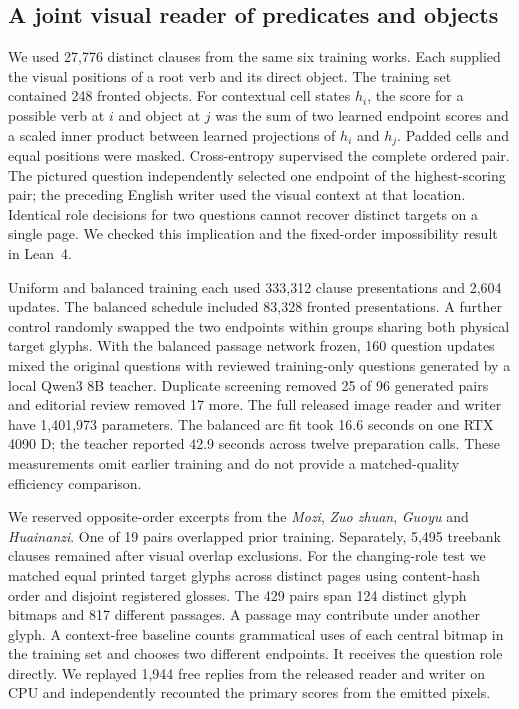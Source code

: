 \subsection*{A joint visual reader of predicates and objects}
We used 27,776 distinct clauses from the same six training works. Each supplied the visual positions of a root verb and its direct object. The training set contained 248 fronted objects. For contextual cell states $h_i$, the score for a possible verb at $i$ and object at $j$ was the sum of two learned endpoint scores and a scaled inner product between learned projections of $h_i$ and $h_j$. Padded cells and equal positions were masked. Cross-entropy supervised the complete ordered pair. The pictured question independently selected one endpoint of the highest-scoring pair; the preceding English writer used the visual context at that location. Identical role decisions for two questions cannot recover distinct targets on a single page. We checked this implication and the fixed-order impossibility result in Lean~4.

Uniform and balanced training each used 333,312 clause presentations and 2,604 updates. The balanced schedule included 83,328 fronted presentations. A further control randomly swapped the two endpoints within groups sharing both physical target glyphs. With the balanced passage network frozen, 160 question updates mixed the original questions with reviewed training-only questions generated by a local Qwen3 8B teacher. Duplicate screening removed 25 of 96 generated pairs and editorial review removed 17 more. The full released image reader and writer have 1,401,973 parameters. The balanced arc fit took 16.6 seconds on one RTX 4090 D; the teacher reported 42.9 seconds across twelve preparation calls. These measurements omit earlier training and do not provide a matched-quality efficiency comparison.

We reserved opposite-order excerpts from the \textit{Mozi}, \textit{Zuo zhuan}, \textit{Guoyu} and \textit{Huainanzi}. One of 19 pairs overlapped prior training. Separately, 5,495 treebank clauses remained after visual overlap exclusions. For the changing-role test we matched equal printed target glyphs across distinct pages using content-hash order and disjoint registered glosses. The 429 pairs span 124 distinct glyph bitmaps and 817 different passages. A passage may contribute under another glyph. A context-free baseline counts grammatical uses of each central bitmap in the training set and chooses two different endpoints. It receives the question role directly. We replayed 1,944 free replies from the released reader and writer on CPU and independently recounted the primary scores from the emitted pixels.
